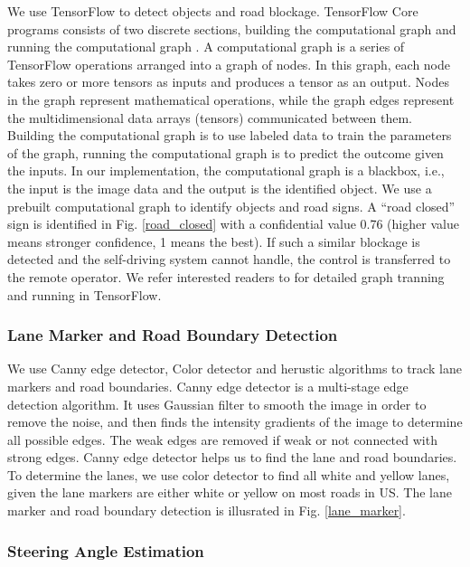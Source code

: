 {We use TensorFlow to detect objects and road blockage. 
TensorFlow Core programs consists of two discrete sections, 
building the computational graph and 
running the computational graph \cite{abadi2016tensorflow}.
A computational graph is a series of TensorFlow operations arranged into a graph of nodes. 
In this graph, each node takes zero or more tensors 
as inputs and produces a tensor as an output. 
Nodes in the graph represent mathematical operations, 
while the graph edges represent the multidimensional 
data arrays (tensors) communicated between them. 
Building the computational graph is to use labeled data 
to train the parameters of the graph, 
running the computational graph is to predict the 
outcome given the inputs. 
In our implementation, the computational graph is a blackbox, 
i.e., the input is the image data and 
the output is the identified object. 
We use a prebuilt computational
graph to identify objects and road signs. 
A ``road closed'' sign is identified in Fig. \ref{road_closed}
with a confidential value 0.76 
(higher value means stronger confidence, 1 means the best). 
If such a similar blockage is detected and the self-driving
system cannot handle, the control is transferred to the
remote operator.  
We refer interested
readers to \cite{abadi2016tensorflow, huang2016speed} for detailed graph tranning
and running in TensorFlow.


\subsubsection{Lane Marker and Road Boundary Detection}


We use Canny edge detector, 
Color detector and herustic algorithms to track lane markers and road boundaries. 
Canny edge detector is a multi-stage edge detection
algorithm. 
It uses Gaussian filter to smooth the image in order to remove the noise, 
and then finds the intensity gradients of the image to determine
all possible edges. 
The weak edges are removed if weak or not connected with strong edges. 
Canny edge detector helps us to find the lane and road boundaries. 
To determine the lanes, we use color detector to find all
white and yellow lanes, given the lane markers are either white
or yellow on most roads in US. 
The lane marker and road boundary detection is illusrated in Fig. \ref{lane_marker}. 


\subsubsection{Steering Angle Estimation}

}
